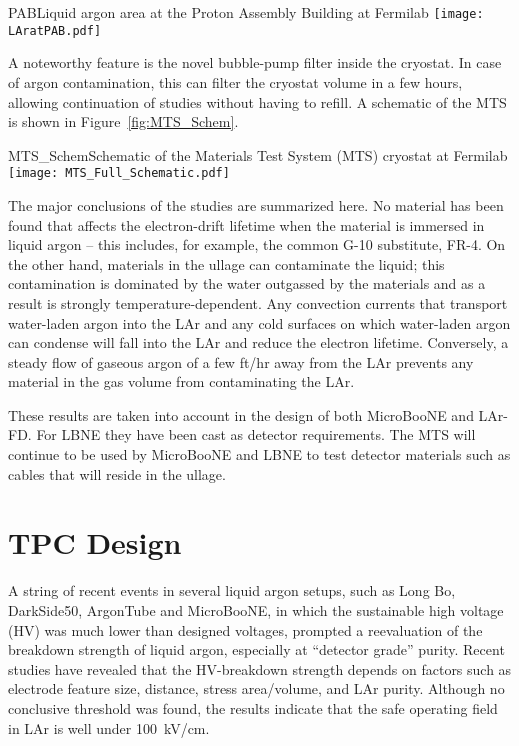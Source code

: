\begin{cdrfigure}{PAB}{Liquid argon area at the Proton Assembly Building at Fermilab}
\texttt{[image: LAratPAB.pdf]}
\end{cdrfigure}

A noteworthy feature is the novel bubble-pump filter inside the cryostat. In case of argon contamination, this can filter the cryostat volume in a few hours, allowing continuation of studies 
 without having to refill. A schematic of the MTS is shown in Figure~\ref{fig:MTS_Schem}.

\begin{cdrfigure}{MTS_Schem}{Schematic of the Materials Test System (MTS) cryostat at Fermilab}
\texttt{[image: MTS\_Full\_Schematic.pdf]}
\end{cdrfigure}

The major conclusions of the studies are summarized here. No material has been found that affects the electron-drift lifetime when the material is immersed in liquid argon -- this includes, for example, the common G-10 substitute, FR-4. On the other hand, materials in the ullage can contaminate the liquid; this contamination is dominated by the water outgassed by the materials and as a result is strongly temperature-dependent. Any convection currents that transport water-laden argon into the LAr and any cold surfaces on which water-laden argon can condense will fall into the LAr and reduce the electron lifetime. Conversely,  a steady flow of gaseous argon of a few ft/hr away from the LAr prevents any material in the gas volume from contaminating the LAr. 

These results are taken into account in the design of both MicroBooNE and LAr-FD. For LBNE they have been cast as detector requirements. The MTS will continue to be used by MicroBooNE and LBNE to test detector materials such as cables that will reside in the ullage.


\section{TPC Design}

A string of recent events in several liquid argon setups, such as Long Bo, DarkSide50, ArgonTube and MicroBooNE, in which the sustainable high voltage (HV) was much lower  than designed voltages,  prompted a reevaluation of the breakdown strength of liquid argon, especially at ``detector grade'' purity. Recent studies \cite{bib:HV_in_LAr_1}\cite{bib:HV_in_LAr_2} have revealed that the HV-breakdown strength depends on factors such as electrode feature size, distance, stress area/volume, and LAr purity. Although no conclusive threshold was found, the results indicate that the safe operating field in LAr is well under 100~kV/cm. 
 
